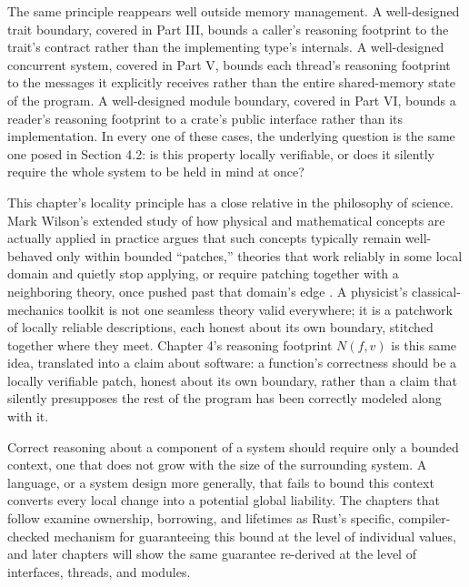 \documentclass[11pt]{book}
\begin{document}
The same principle reappears well outside memory management. A well-designed trait boundary, covered in Part III, bounds a caller's reasoning footprint to the trait's contract rather than the implementing type's internals. A well-designed concurrent system, covered in Part V, bounds each thread's reasoning footprint to the messages it explicitly receives rather than the entire shared-memory state of the program. A well-designed module boundary, covered in Part VI, bounds a reader's reasoning footprint to a crate's public interface rather than its implementation. In every one of these cases, the underlying question is the same one posed in Section 4.2: is this property locally verifiable, or does it silently require the whole system to be held in mind at once?

This chapter's locality principle has a close relative in the philosophy of science. Mark Wilson's extended study of how physical and mathematical concepts are actually applied in practice argues that such concepts typically remain well-behaved only within bounded ``patches,'' theories that work reliably in some local domain and quietly stop applying, or require patching together with a neighboring theory, once pushed past that domain's edge \cite{wilson2006}. A physicist's classical-mechanics toolkit is not one seamless theory valid everywhere; it is a patchwork of locally reliable descriptions, each honest about its own boundary, stitched together where they meet. Chapter 4's reasoning footprint $N(f, v)$ is this same idea, translated into a claim about software: a function's correctness should be a locally verifiable patch, honest about its own boundary, rather than a claim that silently presupposes the rest of the program has been correctly modeled along with it.

\begin{invariantbox}
Correct reasoning about a component of a system should require only a bounded context, one that does not grow with the size of the surrounding system. A language, or a system design more generally, that fails to bound this context converts every local change into a potential global liability. The chapters that follow examine ownership, borrowing, and lifetimes as Rust's specific, compiler-checked mechanism for guaranteeing this bound at the level of individual values, and later chapters will show the same guarantee re-derived at the level of interfaces, threads, and modules.
\end{invariantbox}

\clearpage
\end{document}
